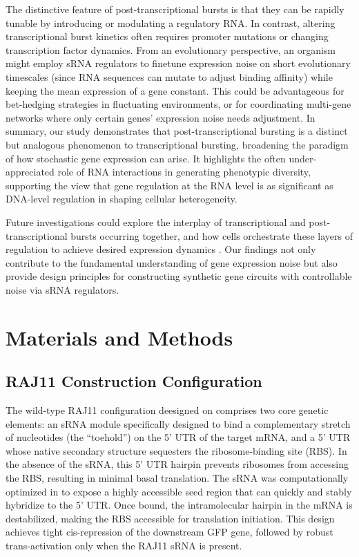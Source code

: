 The distinctive feature of post-transcriptional bursts is that they can be rapidly tunable by introducing or modulating a regulatory RNA. In contrast, altering transcriptional burst kinetics often requires promoter mutations or changing transcription factor dynamics. From an evolutionary perspective, an organism might employ sRNA regulators to finetune expression noise on short evolutionary timescales (since RNA sequences can mutate to adjust binding affinity) while keeping the mean expression of a gene constant. This could be advantageous for bet-hedging strategies in fluctuating environments, or for coordinating multi-gene networks where only certain genes' expression noise needs adjustment. In summary, our study demonstrates that post-transcriptional bursting is a distinct but analogous phenomenon to transcriptional bursting, broadening the paradigm of how stochastic gene expression can arise. It highlights the often under-appreciated role of RNA interactions in generating phenotypic diversity, supporting the view that gene regulation at the RNA level is as significant as DNA-level regulation in shaping cellular heterogeneity.

Future investigations could explore the interplay of transcriptional and post-transcriptional bursts occurring together, and how cells orchestrate these layers of regulation to achieve desired expression dynamics \cite{Tanenbaum2014}. Our findings not only contribute to the fundamental understanding of gene expression noise but also provide design principles for constructing synthetic gene circuits with controllable noise via sRNA regulators.

\section*{Materials and Methods}
\subsection*{RAJ11 Construction Configuration}
The wild-type RAJ11 configuration deesigned on \cite{Rodrigo2015} comprises two core genetic elements: an sRNA module specifically designed to bind a complementary stretch of nucleotides (the ``toehold'') on the 5' UTR of the target mRNA, and a 5' UTR whose native secondary structure sequesters the ribosome-binding site (RBS). In the absence of the sRNA, this 5' UTR hairpin prevents ribosomes from accessing the RBS, resulting in minimal basal translation. The sRNA was computationally optimized in \cite{Rodrigo2015} to expose a highly accessible seed region that can quickly and stably hybridize to the 5' UTR. Once bound, the intramolecular hairpin in the mRNA is destabilized, making the RBS accessible for translation initiation. This design achieves tight cis-repression of the downstream GFP gene, followed by robust trans-activation only when the RAJ11 sRNA is present.

